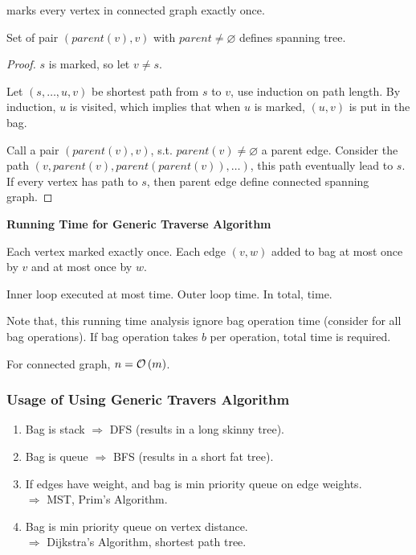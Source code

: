 \begin{lemma}
     marks every vertex in connected graph exactly once.

    Set of pair $(parent(v),v)$ with $parent \neq \varnothing$ defines spanning tree.
\end{lemma}

\begin{proof}
    $s$ is marked, so let $v \neq s$.

    Let $(s,\ldots,u,v)$ be shortest path from $s$ to $v$, use induction on path length.
    By induction, $u$ is visited, which implies that when $u$ is marked,
    $(u,v)$ is put in the bag.

    Call a pair $(parent(v),v)$, s.t. $parent(v) \neq \varnothing$ a parent edge.
    Consider the path $(v,parent(v),parent(parent(v)),\ldots)$, this path eventually lead to $s$.
    If every vertex has path to $s$, then parent edge define connected spanning graph.
\end{proof}

\vspace{0.1in}\noindent\textbf{Running Time for Generic Traverse Algorithm}

Each vertex marked exactly once. Each edge $(v,w)$ added to bag at most once
by $v$ and at most once by $w$.

Inner loop executed at most  time.
Outer loop  time. In total,  time.

Note that, this running time analysis ignore bag operation
time (consider  for all bag operations). If bag operation
takes $b$ per operation,  total time is required.

For connected graph, $n = \mathcal{O}\left(m\right)$.

\subsubsection{Usage of Using Generic Travers Algorithm}
\begin{enumerate}
    \item Bag is stack $\Longrightarrow$ DFS (results in a long skinny tree).
    \item Bag is queue $\Longrightarrow$ BFS (results in a short fat tree).
    \item If edges have weight, and bag is min priority queue on edge weights.\\
        $\Longrightarrow$ MST, Prim's Algorithm.
    \item Bag is min priority queue on vertex distance.\\
        $\Longrightarrow$ Dijkstra's Algorithm, shortest path tree.
\end{enumerate}

